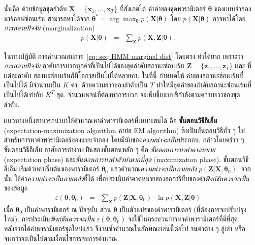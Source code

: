 นั่นคือ 
ด้วยข้อมูลชุดลำดับ $\bm{X} = \{\bm{x}_1, \ldots, \bm{x}_T\}$ ที่สังเกตได้
ค่าค่าของชุดพารามิเตอร์ $\bm{\theta}$ ของแบบจำลองมาร์คอฟซ่อนเร้น สามารถหาได้จาก
$\bm{\theta}^\ast = \arg\max_{\bm{\theta}} p(\bm{X}|\bm{\theta})$
โดย $p(\bm{X}|\bm{\theta})$ อาจหาได้โดย\textit{การสลายปัจจัย} (marginalization)
\begin{eqnarray}
p(\bm{X}|\bm{\theta}) &=& \sum_{\bm{Z}} p(\bm{X}, \bm{Z}|\bm{\theta})
\label{eq: seq HMM marginal dist}.
\end{eqnarray}

ในทางปฏิบัติ การคำนวณสมการ~\ref{eq: seq HMM marginal dist} โดยตรง
ทำได้ยาก
เพราะว่า \textit{การสลายปัจจัย} อาศัยการบวกทุกค่าที่เป็นไปได้ของชุดลำดับสถานะซ่อนเร้น $\bm{Z} = \{\bm{z}_1, \ldots, \bm{z}_T\}$
และ ที่แต่ละลำดับ สถานะซ่อนเร้นก็มีโอกาสเป็นไปได้หลายค่า.
ในที่นี้ กำหนดให้ ค่าของสถานะซ่อนเร้นที่เป็นไปได้ มีจำนวนเป็น $K$ ค่า.
ด้วยความยาวของลำดับเป็น $T$ ทำให้มีชุดค่าของลำดับสถานะซ่อนเร้นที่เป็นไปได้เท่ากับ $K^T$ ชุด.
จำนวนพจน์ที่ต้องทำการบวก จะเพิ่มขึ้นแบบชี้กำลังตามความยาวของชุดลำดับ.

แนวทางหนึ่งสามารถนำมาใช้คำนวณหาค่าพารามิเตอร์ที่เหมาะสมได้
คือ \textbf{ขั้นตอนวิธีอีเอ็ม} (expectation-maximization algorithm คำย่อ EM algorithm)
ซึ่งเป็นขั้นตอนวิธีทั่ว ๆ ไปสำหรับการหาค่าพารามิเตอร์ของแบบจำลอง โดยมีนัยของ\textit{ความน่าจะเป็น}ประกอบ.
กล่าวโดยคร่าว ๆ 
ขั้นตอนวิธีอีเอ็ม อาศัยการทำงานเป็นสองขั้นตอนหลัก ๆ คือ \textit{ขั้นตอนการหาค่าคาดหมาย} (expectation phase)
และ\textit{ขั้นตอนการหาค่าตัวทำมากที่สุด} (maximization phase).
ขั้นตอนวิธีอีเอ็ม เริ่มด้วยค่าเริ่มต้นของพารามิเตอร์ $\bm{\theta}_0$ 
แล้วคำนวณ\textit{ความน่าจะเป็นภายหลัง} $p(\bm{Z}|\bm{X}, \bm{\theta}_0)$.
จากนั้น
ใช้ค่า\textit{ความน่าจะเป็นภายหลัง}ที่ได้ 
เพื่อประเมินค่าคาดหมายของลอการิทึมของค่า\textit{ฟังก์ชันควรจะเป็น}ของข้อมูล
%
\begin{eqnarray}
\varepsilon (\bm{\theta}, \bm{\theta}_0)
&=&
\sum_{\bm{Z}} p(\bm{Z}|\bm{X}, \bm{\theta}_0) \cdot
\ln p(\bm{X},\bm{Z}|\bm{\theta})
\label{eq: seq HMM likelihood function}
\end{eqnarray}
เมื่อ $\bm{\theta}_0$ เป็นค่าพารามิเตอร์ ณ ปัจจุบัน
ส่วน $\bm{\theta}$ เป็นตัวแปรของค่าพารามิเตอร์ (ที่ต้องการจะปรับปรุงใหม่).
การประเมิน\textit{ฟังก์ชันควรจะเป็น} $\varepsilon (\bm{\theta}, \bm{\theta}_0)$ จะใช้ในกระบวนการหาค่าพารามิเตอร์ที่ดีที่สุด.
หลังจากได้ค่าพารามิเตอร์ชุดใหม่แล้ว 
จึงวนซ้ำคำนวณในลักษณะเช่นนี้ต่อไป 
จนค่าต่าง ๆ ลู่เข้า หรือจนกว่าจะเป็นไปตามเงื่อนไขการจบการคำนวณ.

